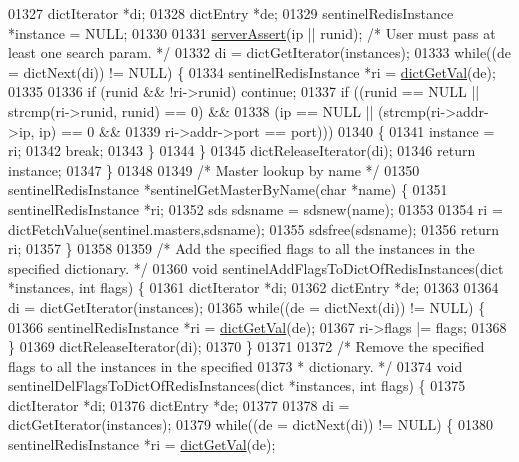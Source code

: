 \begin{DoxyCode}
{{{{{{{{{{{{{{{{01327     dictIterator *di;
01328     dictEntry *de;
01329     sentinelRedisInstance *instance = NULL;
01330 
01331     \hyperlink{server_8h_a88114b5169b4c382df6b56506285e56a}{serverAssert}(ip || runid);   \textcolor{comment}{/* User must pass at least one search param. */}
01332     di = dictGetIterator(instances);
01333     \textcolor{keywordflow}{while}((de = dictNext(di)) != NULL) \{
01334         sentinelRedisInstance *ri = \hyperlink{dict_8h_ae8d2cc391873b2bea2b87c4f80f43120}{dictGetVal}(de);
01335 
01336         \textcolor{keywordflow}{if} (runid && !ri->runid) \textcolor{keywordflow}{continue};
01337         \textcolor{keywordflow}{if} ((runid == NULL || strcmp(ri->runid, runid) == 0) &&
01338             (ip == NULL || (strcmp(ri->addr->ip, ip) == 0 &&
01339                             ri->addr->port == port)))
01340         \{
01341             instance = ri;
01342             \textcolor{keywordflow}{break};
01343         \}
01344     \}
01345     dictReleaseIterator(di);
01346     \textcolor{keywordflow}{return} instance;
01347 \}
01348 
01349 \textcolor{comment}{/* Master lookup by name */}
01350 sentinelRedisInstance *sentinelGetMasterByName(\textcolor{keywordtype}{char} *name) \{
01351     sentinelRedisInstance *ri;
01352     sds sdsname = sdsnew(name);
01353 
01354     ri = dictFetchValue(sentinel.masters,sdsname);
01355     sdsfree(sdsname);
01356     \textcolor{keywordflow}{return} ri;
01357 \}
01358 
01359 \textcolor{comment}{/* Add the specified flags to all the instances in the specified dictionary. */}
01360 \textcolor{keywordtype}{void} sentinelAddFlagsToDictOfRedisInstances(dict *instances, \textcolor{keywordtype}{int} flags) \{
01361     dictIterator *di;
01362     dictEntry *de;
01363 
01364     di = dictGetIterator(instances);
01365     \textcolor{keywordflow}{while}((de = dictNext(di)) != NULL) \{
01366         sentinelRedisInstance *ri = \hyperlink{dict_8h_ae8d2cc391873b2bea2b87c4f80f43120}{dictGetVal}(de);
01367         ri->flags |= flags;
01368     \}
01369     dictReleaseIterator(di);
01370 \}
01371 
01372 \textcolor{comment}{/* Remove the specified flags to all the instances in the specified}
01373 \textcolor{comment}{ * dictionary. */}
01374 \textcolor{keywordtype}{void} sentinelDelFlagsToDictOfRedisInstances(dict *instances, \textcolor{keywordtype}{int} flags) \{
01375     dictIterator *di;
01376     dictEntry *de;
01377 
01378     di = dictGetIterator(instances);
01379     \textcolor{keywordflow}{while}((de = dictNext(di)) != NULL) \{
01380         sentinelRedisInstance *ri = \hyperlink{dict_8h_ae8d2cc391873b2bea2b87c4f80f43120}{dictGetVal}(de);
}}}}}}}}}}}}}}}}
\end{DoxyCode}

